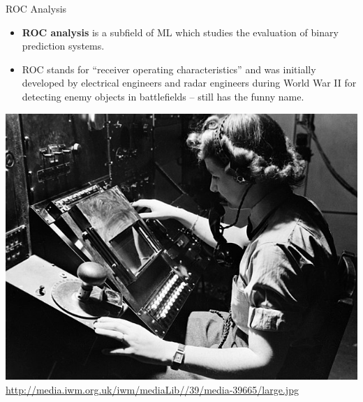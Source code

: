 \documentclass[11pt,compress,t,notes=noshow, xcolor=table]{beamer}
\begin{document}
\begin{frame}{ROC Analysis}

\begin{itemize}
  \item \textbf{ROC analysis} is a subfield of ML which studies the evaluation
  of binary prediction systems.
  \item ROC stands for \enquote{receiver operating characteristics} and was
  initially developed by electrical engineers and radar engineers during World
  War II for detecting enemy objects in battlefields -- still has the funny
  name.
\end{itemize}

\lz

\begin{center}
\includegraphics[width=.4\textwidth]{figure_man/receiver_operator.jpg}
{\tiny \url{http://media.iwm.org.uk/iwm/mediaLib//39/media-39665/large.jpg}}
\end{center}

\end{frame}


\end{document}
